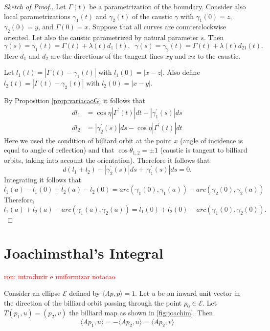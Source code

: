    \begin{proof} [Sketch of Proof.] Let  $\Gamma(t)$  be a  parametrization of the boundary. Consider also local parametrizations   $\gamma_1(t)$ and $\gamma_2(t)$ of the caustic $\gamma$  with $\gamma_1(0)=z$, $\gamma_2(0)=y$, and $\Gamma(0)=x$. Suppose that all curves are   counterclockwise oriented.
   Let also the caustic parametrized by natural parameter $s$. Then
   \[\gamma(s)=\gamma_1(t)=\Gamma(t)+\lambda(t) d_1(t), \;\;\gamma(s)=\gamma_2(t)=\Gamma(t)+\lambda(t) d_21(t).\]
   Here $d_1$ and $d_2$ are the directions of the tangent lines $xy$ and $xz$ to the caustic.
   
   Let $l_1(t)= |\Gamma(t)-\gamma_1(t)|$ with $l_1(0)=|x-z|$. Also define $l_2(t)= |\Gamma(t)-\gamma_2(t)|$ with $l_2(0)=|x-y|$.
   
   By Proposition \ref{prop:variacaoG} it follows that
   \begin{align*}
   dl_1 &=\cos\eta |\Gamma^\prime(t)|dt-|\gamma_1^\prime(s)|ds\\
    dl_2 &=|\gamma_2^\prime(s)|ds-\cos\eta |\Gamma^\prime(t)|dt
   \end{align*}
   Here we used   the condition of billiard orbit at the point $x$ (angle of incidence is equal to angle of reflection) and that $\cos\theta_{1,2}=\pm 1$ (caustic is tangent to billiard orbits, taking into account     the orientation).
   Therefore it follows that
   \[d(l_1+l_2)-|\gamma_2^\prime(s)|ds+|\gamma_1^\prime(s)|ds=0.\]
   Integrating it follows that
   \[l_1(a)-l_1(0)+l_2(a)-l_2(0)=arc(\gamma_1(0),\gamma_1(a))-arc(\gamma_2(0),\gamma_2(a))\]
   Therefore,
   \[l_1(a)+l_2(a)-arc(\gamma_1(a),\gamma_2(a))=l_1(0)+l_2(0)-arc(\gamma_1(0),\gamma_2(0)).\]
   
   
   \end{proof}

\section{Joachimsthal's Integral}

\textcolor{red}{ron: introduzir e uniformizar notacao}


\begin{proposition}\label{prop:invariant} Consider an ellipse $\mathcal{E}$ defined by $\langle Ap,p\rangle=1$. Let $u$ be an inward unit vector in the direction of the billiard orbit passing through the point $p_0\in\mathcal{E} $. Let $T(p_1,u)=(p_2,v)$ the billiard map as shown in   \cref{fig:joachim}.
	Then 
	\[  \langle Ap_1,u\rangle =  -\langle Ap_2,u\rangle=  \langle Ap_2,v\rangle  \]
	
	\end{proposition}

